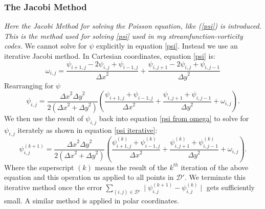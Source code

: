 \documentclass{article}
\begin{document}
\subsubsection*{The Jacobi Method}
{\it{Here the Jacobi Method for solving the Poisson equation, like (\ref{psi}) is introduced. This is the method used for solving \ref{psi} used in my streamfunction-vorticity codes.}}
\vspace{0.3cm}
\newline
We cannot solve for $\psi$ explicitly in equation \ref{psi}. Instead we use an iterative Jacobi method. In Cartesian coordinates, equation \ref{psi} is:
\begin{equation}
	\omega_{i,j} = \frac{\psi_{i+1,j} - 2 \psi_{i,j} + \psi_{i-1,j}  }{{\Delta x}^2} + \frac{\psi_{i,j+1} - 2 \psi_{i,j} + \psi_{i,j-1}  }{{\Delta y}^2}
	\label{psi disc}
\end{equation}
Rearranging for $\psi$
\begin{equation}
	\psi_{i,j} = \frac{{\Delta x}^2 {\Delta y}^2  }{2({\Delta x}^2  + {\Delta y}^2)} (\frac{\psi_{i+1,j} +\psi_{i-1,j} }{{\Delta x}^2} + \frac{\psi_{i,j+1} +\psi_{i,j-1}  }{{\Delta y}^2 }  + \omega_{i,j}).
	\label{psi from omega}
\end{equation}
We then use the result of $\psi_{i,j}$ back into equation \ref{psi from omega} to solve for $\psi_{i,j}$ iterately as shown in equation \ref{psi iterative}:
\begin{equation}
	\psi_{i,j}^{(k+1)} = \frac{{\Delta x}^2 {\Delta y}^2  }{2({\Delta x}^2  + {\Delta y}^2)} (\frac{\psi_{i+1,j}^{(k)} +\psi_{i-1,j}^{(k)}  }{{\Delta x}^2} + \frac{\psi_{i,j+1}^{(k)} +\psi_{i,j-1}^{(k)}  }{{\Delta y}^2 } + \omega_{i,j}).
	\label{psi iterative}
\end{equation}
Where the superscript $(k)$ means the result of the $k^{th}$ iteration of the above equation and this operation us applied to all points in $\mathcal{D}'$.
 We terminate this iterative method once the error $\sum_{(i,j) \in \mathcal{D'}} \mid \psi_{i,j}^{(k+1)} - \psi_{i,j}^{(k)} \mid$ gets sufficiently small. A similar method is applied in polar coordinates. 
\end{document}
